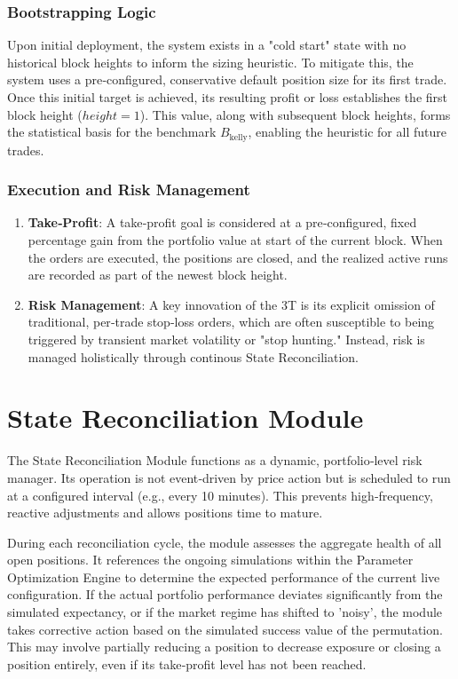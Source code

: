 \documentclass[10pt]{article}
\begin{document}
\subsubsection{Bootstrapping Logic}
Upon initial deployment, the system exists in a "cold start" state with no historical block heights to inform the sizing heuristic. To mitigate this, the system uses a pre‑configured, conservative default position size for its first trade. Once this initial target is achieved, its resulting profit or loss establishes the first block height ($height = 1$). This value, along with subsequent block heights, forms the statistical basis for the benchmark $B_{\text{kelly}}$, enabling the heuristic for all future trades.

\subsubsection{Execution and Risk Management}
\begin{enumerate}
    \item \textbf{Take‑Profit}: A take‑profit goal is considered at a pre‑configured, fixed percentage gain from the portfolio value at start of the current block. When the orders are executed, the positions are closed, and the realized active runs are recorded as part of the newest block height.
    \item \textbf{Risk Management}: A key innovation of the 3T is its explicit omission of traditional, per‑trade stop‑loss orders, which are often susceptible to being triggered by transient market volatility or "stop hunting." Instead, risk is managed holistically through continous State Reconciliation.
\end{enumerate}

\section{State Reconciliation Module}
The State Reconciliation Module functions as a dynamic, portfolio‑level risk manager. Its operation is not event‑driven by price action but is scheduled to run at a configured interval (e.g., every 10 minutes). This prevents high‑frequency, reactive adjustments and allows positions time to mature.

During each reconciliation cycle, the module assesses the aggregate health of all open positions. It references the ongoing simulations within the Parameter Optimization Engine to determine the expected performance of the current live configuration. If the actual portfolio performance deviates significantly from the simulated expectancy, or if the market regime has shifted to 'noisy', the module takes corrective action based on the simulated success value of the permutation. This may involve partially reducing a position to decrease exposure or closing a position entirely, even if its take‑profit level has not been reached.
\end{document}
